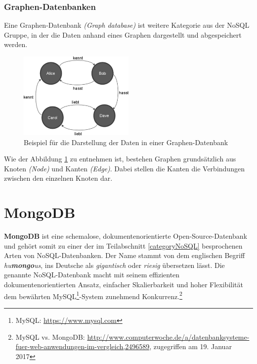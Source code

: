 \subsubsection{Graphen-Datenbanken}
Eine Graphen-Datenbank \textit{(Graph database)} ist weitere Kategorie aus der NoSQL Gruppe, in der die Daten anhand eines Graphen dargestellt und abgespeichert werden.

\begin{figure}[H]
\centering
\includegraphics[width=0.5\textwidth]{resources/gdb}
\caption[Beispiel für die Darstellung der Daten in einer Graphen-Datenbank]{Beispiel für die Darstellung der Daten in einer Graphen-Datenbank\protect\footnotemark}
\label{img:gdb}
\end{figure}

Wie der Abbildung \ref{img:gdb} zu entnehmen ist, bestehen Graphen grundsätzlich aus Knoten \textit{(Node)} und Kanten \textit{(Edge)}. Dabei stellen die Kanten die Verbindungen zwischen den einzelnen Knoten dar.

\section{MongoDB}\label{mongo}
\textbf{MongoDB} ist eine  schemalose, dokumentenorientierte Open-Source-Datenbank und gehört somit zu einer der im Teilabschnitt \ref{categoryNoSQL} besprochenen Arten von NoSQL-Datenbanken. Der Name stammt von dem englischen Begriff \textit{hu\textbf{mongo}us}, ins Deutsche als \textit{gigantisch} oder \textit{riesig} übersetzen lässt. Die genannte NoSQL-Datenbank macht mit seinem effizienten dokumentenorientierten Ansatz, einfacher Skalierbarkeit und hoher Flexibilität dem bewährten MySQL\footnote{MySQL: \url{https://www.mysql.com}}-System zunehmend Konkurrenz.\footnote{MySQL vs. MongoDB: \url{http://www.computerwoche.de/a/datenbanksysteme-fuer-web-anwendungen-im-vergleich,2496589}, zugegriffen am 19. Januar 2017} 

